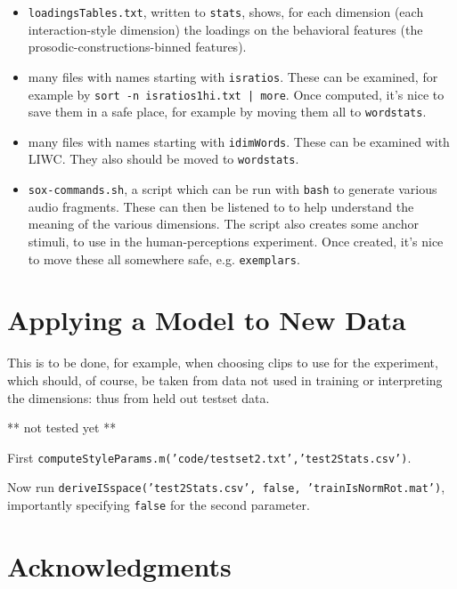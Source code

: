 \documentclass[11pt]{article}
\begin{document}
\begin{itemize}   \setlength{\itemsep}{0pt}\setlength{\parskip}{0pt}
\item {\tt loadingsTables.txt}, written to {\tt stats}, shows, for each
  dimension (each interaction-style dimension) the loadings on the
  behavioral features (the prosodic-constructions-binned features).
\item many files with names starting with {\tt isratios}.  These can
  be examined, for example by {\tt sort -n isratios1hi.txt | more}.
  Once computed, it's nice to save them in a safe place, for example
  by moving them all to {\tt wordstats}. 
\item many files with names starting with {\tt idimWords}.  These can
  be examined with LIWC.  They also should be moved to {\tt wordstats}.
\item {\tt sox-commands.sh}, a script which can be run with {\tt bash}
  to generate various audio fragments.  These can then be listened to
  to help understand the meaning of the various dimensions.  The
  script also creates some anchor stimuli, to use in the
  human-perceptions experiment.  Once created, it's nice to move these
  all somewhere safe, e.g. {\tt exemplars}.
\end{itemize}

\section{Applying a Model to New Data}

This is to be done, for example, when choosing clips to use for the
experiment, which should, of course, be taken from data not used in
training or interpreting the dimensions: thus from held out testset
data.

** not tested yet **

First {\tt computeStyleParams.m('code/testset2.txt','test2Stats.csv')}.

Now run {\tt deriveISspace('test2Stats.csv', false,
  'trainIsNormRot.mat')}, importantly specifying {\tt false} for the
second parameter.


\section{Acknowledgments }  



%

\end{document}
